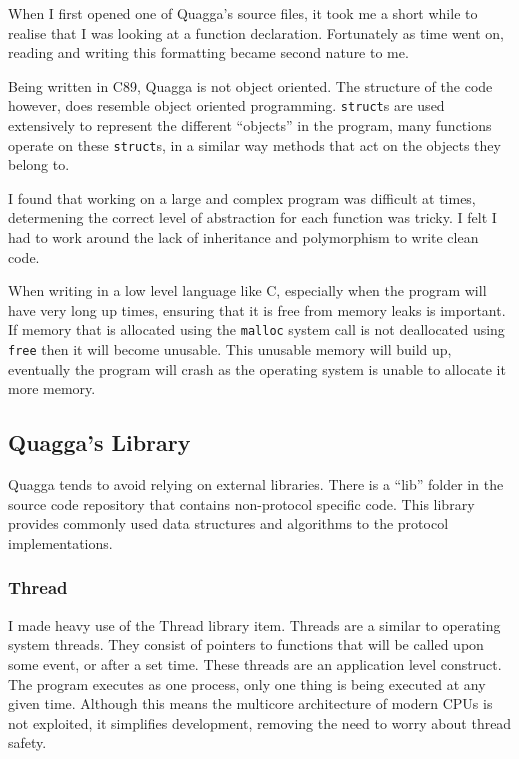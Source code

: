 \documentclass[12pt]{report}
\begin{document}
When I first opened one of Quagga's source files, it took me a short while to
realise that I was looking at a function declaration. Fortunately as time went
on, reading and writing this formatting became second nature to me. 

Being written in C89, Quagga is not object oriented. The structure of the code
however, does resemble object oriented programming. \texttt{struct}s are used
extensively to represent the different ``objects'' in the program, many
functions operate on these \texttt{struct}s, in a similar way methods that
act on the objects they belong to.

I found that working on a large and complex program was difficult at times,
determening the correct level of abstraction for each function was tricky.  I
felt I had to work around the lack of inheritance and polymorphism to write
clean code. 

When writing in a low level language like C, especially when the program will
have very long up times, ensuring that it is free from memory leaks is
important. If memory that is allocated using the \texttt{malloc} system call is
not deallocated using \texttt{free} then it will become unusable. This unusable
memory will build up, eventually the program will crash as the operating system
is unable to allocate it more memory.
 

\subsection{Quagga's Library}
Quagga tends to avoid relying on external libraries. There is a ``lib'' folder
in the source code repository that contains non-protocol specific code. This
library provides commonly used data structures and algorithms to the protocol
implementations. 

\subsubsection{Thread}
I made heavy use of the Thread library item. Threads are a similar to
operating system threads. They consist of pointers to functions that will be
called upon some event, or after a set time. These threads are an application
level construct. The program  executes as one process, only one thing is
being executed at any given time. Although this means the multicore
architecture of modern CPUs  is not
exploited, it simplifies development, removing the need to worry about thread
safety.
\end{document}
